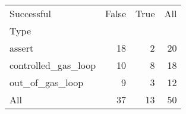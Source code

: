 \begin{tabular}{lrrr}
\toprule
Successful &  False &  True &  All \\
Type                &        &       &      \\
\midrule
assert              &     18 &     2 &   20 \\
controlled\_gas\_loop &     10 &     8 &   18 \\
out\_of\_gas\_loop     &      9 &     3 &   12 \\
All                 &     37 &    13 &   50 \\
\bottomrule
\end{tabular}
